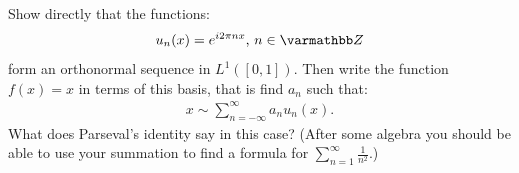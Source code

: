 \begin{exercise}
Show directly that the functions:
    \begin{equation*}
    \begin{split}
        u_n(x) = e^{i2\pi n x}\text{, }n \in \bfZ
    \end{split}
    \end{equation*}
form an orthonormal sequence in $L^1([0,1])$. Then write the function $f(x) = x$ in terms of this basis, that is find $a_n$ such that:
    \begin{equation*}
    \begin{split}
        x \sim \sum_{n = -\infty}^\infty a_n u_n(x).
    \end{split}
    \end{equation*}
What does Parseval's identity say in this case? (After some algebra you should be able to use your summation to find a formula for $\sum_{n = 1}^\infty \frac{1}{n^2}$.)
\end{exercise}
